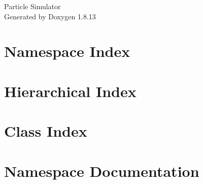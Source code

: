 \documentclass[twoside]{book}
\newcommand{\+}{\discretionary{\mbox{\scriptsize$\hookleftarrow$}}{}{}}
\newcommand{\clearemptydoublepage}{%
  \newpage{\pagestyle{empty}\cleardoublepage}%
}
\begin{document}
\hypersetup{pageanchor=false,
             bookmarksnumbered=true,
             pdfencoding=unicode
            }
\begin{titlepage}
\vspace*{7cm}
\begin{center}%
{\Large Particle Simulator }\\
\vspace*{1cm}
{\large Generated by Doxygen 1.8.13}\\
\end{center}
\end{titlepage}
\clearemptydoublepage
{}
\tableofcontents
\clearemptydoublepage
{}
\hypersetup{pageanchor=true}

\chapter{Namespace Index}

\chapter{Hierarchical Index}

\chapter{Class Index}

\chapter{Namespace Documentation}












\end{document}
